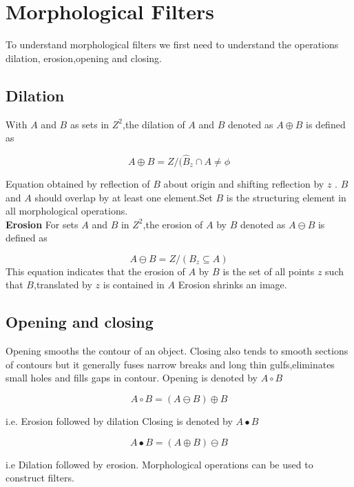 \section{Morphological Filters}

To understand morphological filters we first need to understand the operations dilation, erosion,opening  and  closing.

\subsection{Dilation}
With $A$ and $B$ as sets in $Z^{2}$,the dilation of $A$ and $B$ denoted as $A\oplus B$ is defined as

\[A\oplus B={Z/(\hat{B}_{z}\cap A \neq \phi}\]

Equation obtained by reflection of $B$ about origin and shifting reflection by $ z$ .
$B$  and $A$ should overlap by at least one element.Set $B$ is the structuring element in all morphological operations.\\
 \textbf{Erosion} For sets $A$ and $B$ in $Z^{2}$,the erosion of $A$ by $B$ denoted as $A\ominus B$ is defined as

\[ A\ominus B={Z/(B_{z}\subseteq A )} \]
This equation indicates that the erosion of $A$ by $B$ is the set of all points $z$ such that $B$,translated by $z$ is contained in $A$ Erosion shrinks an image.

\subsection{Opening and closing}

Opening smooths the contour of an object.
 Closing also tends to smooth sections of contours but it generally fuses narrow breaks and long thin gulfs,eliminates small holes and fills gaps in contour.
Opening is denoted by $A\circ B$

\[A\circ B=(A\ominus B)\oplus B\]

  i.e. Erosion followed by dilation
 Closing is denoted by $A\bullet B$

 \[A\bullet B=(A\oplus B)\ominus B\]

 i.e Dilation followed by erosion.
 Morphological operations can be used to construct filters.


